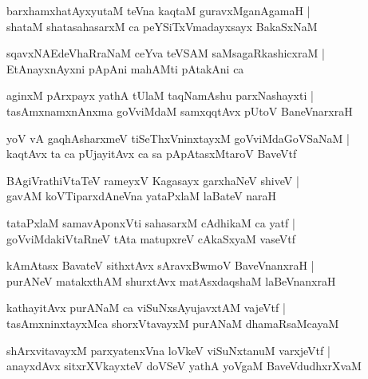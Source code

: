 \documentclass[twoside,12pt,openright]{book}
\newcounter{shloka}[chapter]
\begin{document}
\begin{shloka}%
barxhamxhatAyxyutaM teVna kaqtaM guravxMganAgamaH |\\
shataM shatasahasarxM ca peYSiTxVmadayxsayx BakaSxNaM 
\end{shloka}

\begin{shloka}%
sqavxNAEdeVhaRraNaM ceYva teVSAM saMsagaRkashicxraM |\\
EtAnayxnAyxni pApAni mahAMti pAtakAni ca 
\end{shloka}

\begin{shloka}%
aginxM pArxpayx yathA tUlaM taqNamAshu parxNashayxti |\\
tasAmxnamxnAnxma goVviMdaM samxqqtAvx pUtoV BaneVnarxraH 
\end{shloka}

\begin{shloka}%
yoV vA gaqhAsharxmeV tiSeThxVninxtayxM goVviMdaGoVSaNaM |\\
kaqtAvx ta ca pUjayitAvx ca sa pApAtasxMtaroV BaveVtf
\end{shloka}

\begin{shloka}%
BAgiVrathiVtaTeV rameyxV Kagasayx garxhaNeV shiveV |\\
gavAM koVTiparxdAneVna yataPxlaM laBateV naraH 
\end{shloka}

\begin{shloka}%
tataPxlaM samavAponxVti sahasarxM cAdhikaM ca yatf |\\
goVviMdakiVtaRneV tAta matupxreV cAkaSxyaM vaseVtf
\end{shloka}

\begin{shloka}%
kAmAtasx BavateV sithxtAvx sAravxBwmoV BaveVnanxraH |\\
purANeV matakxthAM shurxtAvx matAsxdaqshaM laBeVnanxraH
\end{shloka}

\begin{shloka}%
kathayitAvx purANaM ca viSuNxsAyujavxtAM vajeVtf |\\
tasAmxninxtayxMca shorxVtavayxM purANaM dhamaRsaMcayaM 
\end{shloka}

\begin{shloka}%
shArxvitavayxM parxyatenxVna loVkeV viSuNxtanuM varxjeVtf |\\
anayxdAvx sitxrXVkayxteV doVSeV yathA yoVgaM BaveVdudhxrXvaM 
\end{shloka}
\end{document}
